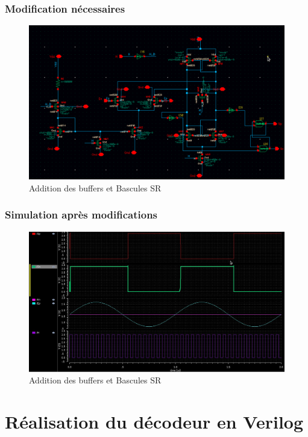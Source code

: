 \documentclass{beamer}
\begin{document}
\begin{frame}
\frametitle{Modification n\'ecessaires}

\begin{figure}[!htb]
  \includegraphics[width=0.8\linewidth]{comparateur_schema_cadence_SR.png}
  \caption{Addition des buffers et Bascules SR}
\end{figure}

\end{frame}


\begin{frame}
\frametitle{Simulation apr\`es modifications}

\begin{figure}[!htb]
  \includegraphics[width=0.8\linewidth]{sim_comp_after_SR_FF.jpg}
  \caption{Addition des buffers et Bascules SR}
\end{figure}

\end{frame}


\section{R\'ealisation du d\'ecodeur en Verilog}
\end{document}
